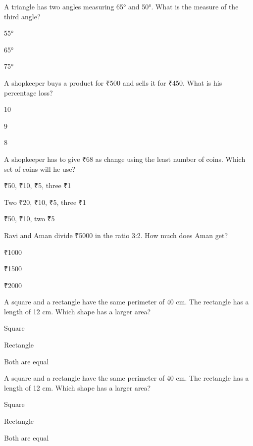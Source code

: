 \begin{enhancedmcq}{A triangle has two angles measuring 65° and 50°. What is the measure of the third angle?}
\item 55°
\item 65°
\item 75°

\end{enhancedmcq}
\begin{enhancedmcq}{A shopkeeper buys a product for ₹500 and sells it for ₹450. What is his percentage loss?}
\item 10 %
\item 9 %
\item 8 %

\end{enhancedmcq}
\begin{enhancedmcq}{A shopkeeper has to give ₹68 as change using the least number of coins. Which set of coins will he use?}
\item ₹50, ₹10, ₹5, three ₹1
\item Two ₹20, ₹10, ₹5, three ₹1
\item ₹50, ₹10, two ₹5

\end{enhancedmcq}
\begin{enhancedmcq}{Ravi and Aman divide ₹5000 in the ratio 3:2. How much does Aman get?}
\item ₹1000
\item ₹1500
\item ₹2000

\end{enhancedmcq}
\begin{enhancedmcq}{A square and a rectangle have the same perimeter of 40 cm. The rectangle has a length of 12 cm. Which shape has a larger area?}
\item Square
\item Rectangle
\item Both are equal

\end{enhancedmcq}
\begin{enhancedmcq}{A square and a rectangle have the same perimeter of 40 cm. The rectangle has a length of 12 cm. Which shape has a larger area?}
\item Square
\item Rectangle
\item Both are equal

\end{enhancedmcq}
